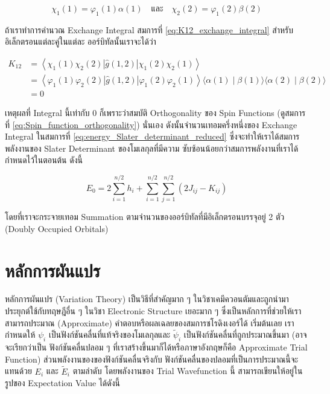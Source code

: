 \begin{equation}
  \chi_1(1) = \varphi_1(1) \alpha(1)
  \quad \text{และ} \quad
  \chi_2(2) = \varphi_1(2) \beta(2)
\end{equation}

\noindent ถ้าเราทำการคำนวณ Exchange Integral สมการที่ \eqref{eq:K12_exchange_integral} สำหรับอิเล็กตรอนแต่ละคู่ในแต่ละ%
ออร์บิทัลนั้นเราจะได้ว่า

\begin{equation}
  \begin{aligned}
    K_{12}
     & = \left\langle\chi_1(1) \chi_2(2)|\hat{g}(1,2)| \chi_1(2) \chi_2(1)\right\rangle \\
     & = \left\langle\varphi_1(1) \varphi_2(2)|\hat{g}(1,2)| \varphi_1(2)
    \varphi_2(1)\right\rangle\langle\alpha(1) \mid \beta(1)\rangle\langle\alpha(2)
    \mid \beta(2)\rangle                                                                \\
     & = 0
  \end{aligned}
\end{equation}

\noindent เหตุผลที่ Integral นี้เท่ากับ 0 ก็เพราะว่าสมบัติ Orthogonality ของ Spin Functions
(ดูสมการที่ \eqref{eq:Spin_function_orthogonality}) นั่นเอง ดังนั้นจำนวนเทอมครึ่งหนึ่งของ Exchange Integral ในสมการที่
\eqref{eq:energy_Slater_determinant_reduced} ซึ่งจะทำให้เราได้สมการพลังงานของ Slater Determinant ของโมเลกุลที่มีความ%
ซับซ้อนน้อยกว่าสมการพลังงานที่เราได้กำหนดไว้ในตอนต้น ดังนี้

\begin{equation}
  E_0
  =
  2 \sum_{i=1}^{n / 2} h_i
  + \sum_{i=1}^{n / 2}
  \sum_{j=1}^{n / 2}
  \left(2 J_{i j} - K_{i j}\right)
\end{equation}

\noindent โดยที่เราจะกระจายเทอม Summation ตามจำนวนของออร์บิทัลที่มีอิเล็กตรอนบรรจุอยู่ 2 ตัว (Doubly Occupied Orbitals)

\section{หลักการผันแปร}

หลักการผันแปร (Variation Theory) เป็นวิธีที่สำคัญมาก ๆ ในวิชาเคมึควอนตัมและถูกนำมาประยุกต์ใช้กับทฤษฎีอื่น ๆ ในวิชา Electronic
Structure เยอะมาก ๆ ซึ่งเป็นหลักการที่ช่วยให้เราสามารถประมาณ (Approximate) คำตอบหรือผลเฉลยของสมการชโรดิงเงอร์ได้ เริ่มต้นเลย%
เรากำหนดให้ $\psi_i$ เป็นฟังก์ชันคลื่นที่แท้จริงของโมเลกุลและ $\tilde{\psi}_i$ เป็นฟังก์ชันคลื่นที่ถูกประมาณขึ้นมา (อาจจะเรียกว่าเป็น%
ฟังก์ชันคลื่นปลอม ๆ ที่เราสร้างขึ้นมาก็ได้หรือภาษาอังกฤษก็คือ Approximate Trial Function) ส่วนพลังงานของของฟังก์ชันคลื่นจริงกับ%
ฟังก์ชันคลื่นของปลอมที่เป็นการประมาณนี้จะแทนด้วย $E_i$ และ $\tilde{E}_i$ ตามลำดับ โดยพลังงานของ Trial Wavefunction นี้%
สามารถเขียนให้อยู่ในรูปของ Expectation Value ได้ดังนี้

